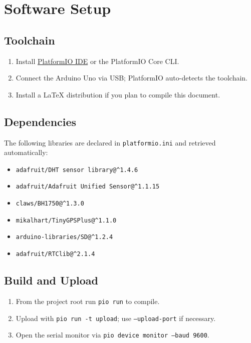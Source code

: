 \documentclass[11pt,a4paper]{article}
\begin{document}
\section{Software Setup}

\subsection{Toolchain}
\begin{enumerate}
  \item Install \href{https://platformio.org/}{PlatformIO IDE} or the PlatformIO Core CLI.
  \item Connect the Arduino Uno via USB; PlatformIO auto-detects the toolchain.
  \item Install a LaTeX distribution if you plan to compile this document.
\end{enumerate}

\subsection{Dependencies}

The following libraries are declared in \texttt{platformio.ini} and retrieved automatically:
\begin{itemize}
  \item \texttt{adafruit/DHT sensor library@{\^}1.4.6}
  \item \texttt{adafruit/Adafruit Unified Sensor@{\^}1.1.15}
  \item \texttt{claws/BH1750@{\^}1.3.0}
  \item \texttt{mikalhart/TinyGPSPlus@{\^}1.1.0}
  \item \texttt{arduino-libraries/SD@{\^}1.2.4}
  \item \texttt{adafruit/RTClib@{\^}2.1.4}
\end{itemize}

\subsection{Build and Upload}

\begin{enumerate}
  \item From the project root run \texttt{pio run} to compile.
  \item Upload with \texttt{pio run -t upload}; use \texttt{--upload-port} if necessary.
  \item Open the serial monitor via \texttt{pio device monitor --baud 9600}.
\end{enumerate}
\end{document}
